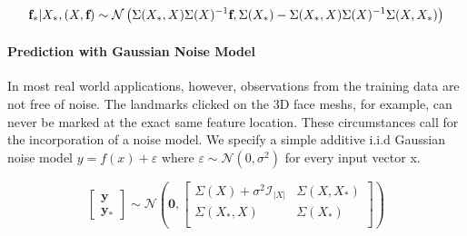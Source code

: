 \begin{equation}
    \textbf{f}_{*}\vert X_{*},(X,\textbf{f}) \sim \mathcal{N}\left(\Sigma(X_{*},X)\Sigma(X)^{-1}\textbf{f},\\\Sigma(X_{*})-\Sigma(X_{*},X)\Sigma(X)^{-1}\Sigma(X,X_{*})\right)
\end{equation}

\paragraph{Prediction with Gaussian Noise Model}
In most real world applications, however, observations from the training data are not free of noise. The landmarks clicked on the 3D face meshs, for example, can never be marked at the exact same feature location. These circumstances call for the incorporation of a noise model. We specify a simple additive i.i.d Gaussian noise model $y = f(x) + \varepsilon$ where $\varepsilon \sim \mathcal{N}(0, \sigma^2)$ for every input vector x. 

\begin{equation}
\begin{bmatrix}\textbf{y}\\\textbf{y}_{*}\end{bmatrix}
\sim \mathcal{N}\left(\textbf{0},
\begin{bmatrix}
    \Sigma(X) + \sigma^2\mathcal{I}_{\left|X \right|} & \Sigma(X,X_{*})\\
    \Sigma(X_{*},X) & \Sigma(X_{*})\\
\end{bmatrix}
\right)
\end{equation}

